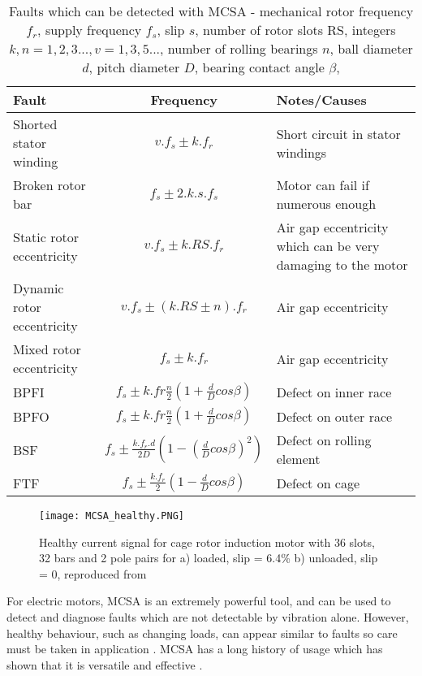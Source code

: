 \begin{table}
    \renewcommand{\arraystretch}{1.4}
	\begin{center}
		\begin{tabularx}{\textwidth}{XcX}%
			\toprule
			\textbf{Fault} & \textbf{Frequency} & \textbf{Notes/Causes} \\
			\midrule
			Shorted stator winding & $v.f_s \pm k.f_r$ & Short circuit in stator windings  \\
			Broken rotor bar & $f_s \pm 2.k.s.f_s$ & Motor can fail if numerous enough \\
			Static rotor eccentricity & $v.f_s \pm k.RS.f_r$ & Air gap eccentricity which can be very damaging to the motor\\
			Dynamic rotor eccentricity & $v.f_s \pm (k.RS\pm n).f_r$ & Air gap eccentricity\\
			Mixed rotor eccentricity & $f_s \pm k.f_r$ & Air gap eccentricity\\
			BPFI & $f_s \pm k.fr\frac{n}{2}(1+\frac{d}{D}cos\beta)$ & Defect on inner race\\
			BPFO & $f_s \pm k.fr\frac{n}{2}(1+\frac{d}{D}cos\beta)$ & Defect on outer race\\
			BSF & $f_s \pm \frac{k.f_{r}.d}{2D}(1-(\frac{d}{D}cos\beta)^2)$ & Defect on rolling element \\
			FTF & $f_s \pm \frac{k.f_{r}}{2}(1-\frac{d}{D}cos\beta)$ & Defect on cage\\
			\bottomrule
		\end{tabularx}
		\caption{Faults which can be detected with MCSA - mechanical rotor frequency $f_r$, supply frequency $f_s$, slip $s$, number of rotor slots RS, integers $k, n = 1, 2, 3..., v = 1, 3, 5...$, number of rolling bearings $n$, ball diameter $d$, pitch diameter $D$, bearing contact angle $\beta$, \cite{CM_mcsa_vib}\cite{ISO20958}}
		\label{tab:mcsafaults}%
	\end{center}
\end{table}

\begin{figure}
    \centering
    \texttt{[image: MCSA\_healthy.PNG]}
    \caption{Healthy current signal for cage rotor induction motor with 36 slots, 32 bars and 2 pole pairs for a) loaded, slip = 6.4\% b) unloaded, slip = 0, reproduced from \cite{MCSA_healthy_signal}}
    \label{fig:MCSA_healthy}
\end{figure}


For electric motors, MCSA is an extremely powerful tool, and can be used to detect and diagnose faults which are not detectable by vibration alone.
However, healthy behaviour, such as changing loads, can appear similar to faults so care must be taken in application \cite{CM_mcsa_vib}.
MCSA has a long history of usage which has shown that it is versatile and effective \cite{MCSA_case_studies}.
\par

